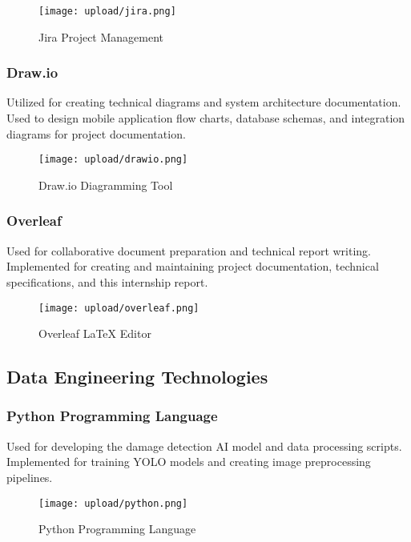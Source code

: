 \documentclass[12pt,a4paper]{report}
\begin{document}
\begin{figure}[H]
    \centering
    \texttt{[image: upload/jira.png]}
    \caption{Jira Project Management}
    \label{fig:jira}
\end{figure}

\subsubsection{Draw.io}
Utilized for creating technical diagrams and system architecture documentation. Used to design mobile application flow charts, database schemas, and integration diagrams for project documentation.

\begin{figure}[H]
    \centering
    \texttt{[image: upload/drawio.png]}
    \caption{Draw.io Diagramming Tool}
    \label{fig:drawio}
\end{figure}

\subsubsection{Overleaf}
Used for collaborative document preparation and technical report writing. Implemented for creating and maintaining project documentation, technical specifications, and this internship report.

\begin{figure}[H]
    \centering
    \texttt{[image: upload/overleaf.png]}
    \caption{Overleaf LaTeX Editor}
    \label{fig:overleaf}
\end{figure}



\subsection{Data Engineering Technologies}

\subsubsection{Python Programming Language}
Used for developing the damage detection AI model and data processing scripts. Implemented for training YOLO models and creating image preprocessing pipelines.

\begin{figure}[H]
    \centering
    \texttt{[image: upload/python.png]}
    \caption{Python Programming Language}
    \label{fig:python}
\end{figure}
\end{document}
